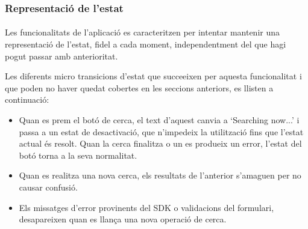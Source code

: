 \subsubsection{Representació de l'estat}

\paragraph{}
Les funcionalitats de l'aplicació es caracteritzen per intentar mantenir una representació de l'estat, fidel a cada moment, independentment del que hagi pogut passar amb anterioritat.

Les diferents micro transicions d'estat que succeeixen per aquesta funcionalitat i que poden no haver quedat cobertes en les seccions anteriors, es llisten a continuació:

\begin{itemize}
    \item Quan es prem el botó de cerca, el text d'aquest canvia a `Searching now...' i passa a un estat de desactivació, que n'impedeix la utilització fins que l'estat actual és resolt. Quan la cerca finalitza o un es produeix un error, l'estat del botó torna a la seva normalitat.
    \item Quan es realitza una nova cerca, els resultats de l'anterior s'amaguen per no causar confusió.
    \item Els missatges d'error provinents del SDK o validacions del formulari, desapareixen quan es llança una nova operació de cerca.
\end{itemize}
